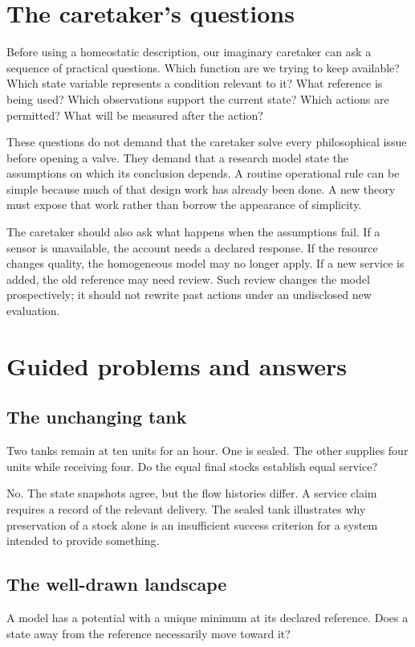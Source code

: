 \section{The caretaker's questions}
Before using a homeostatic description, our imaginary caretaker can ask a sequence of practical questions. Which function are we trying to keep available? Which state variable represents a condition relevant to it? What reference is being used? Which observations support the current state? Which actions are permitted? What will be measured after the action?

These questions do not demand that the caretaker solve every philosophical issue before opening a valve. They demand that a research model state the assumptions on which its conclusion depends. A routine operational rule can be simple because much of that design work has already been done. A new theory must expose that work rather than borrow the appearance of simplicity.

The caretaker should also ask what happens when the assumptions fail. If a sensor is unavailable, the account needs a declared response. If the resource changes quality, the homogeneous model may no longer apply. If a new service is added, the old reference may need review. Such review changes the model prospectively; it should not rewrite past actions under an undisclosed new evaluation.

\section{Guided problems and answers}
\subsection{The unchanging tank}
Two tanks remain at ten units for an hour. One is sealed. The other supplies four units while receiving four. Do the equal final stocks establish equal service?

No. The state snapshots agree, but the flow histories differ. A service claim requires a record of the relevant delivery. The sealed tank illustrates why preservation of a stock alone is an insufficient success criterion for a system intended to provide something.

\subsection{The well-drawn landscape}
A model has a potential with a unique minimum at its declared reference. Does a state away from the reference necessarily move toward it?

